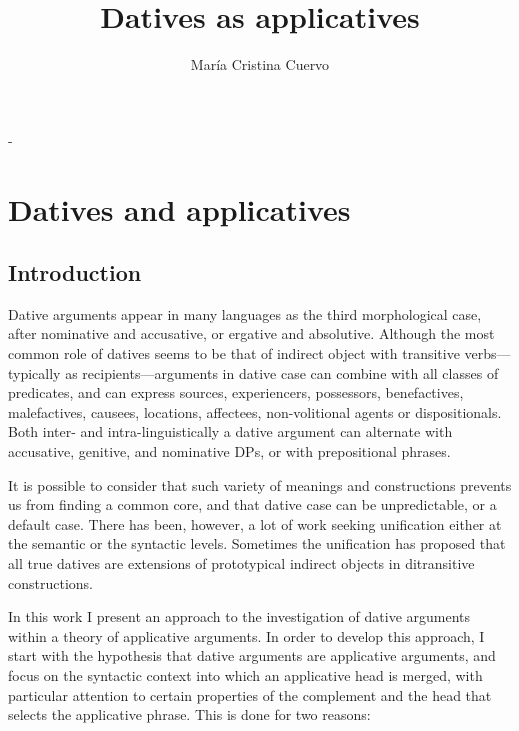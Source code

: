 \documentclass[output=paper,colorlinks,citecolor=brown,nonflat]{./langscibook}
\author{María Cristina Cuervo\affiliation{University of Toronto}}
\title{Datives as applicatives}
\begin{document}
\maketitle 

-%
\section{Datives and applicatives}\label{sec:cuervo:1}

\subsection{Introduction}\label{sec:cuervo:1.1}

Dative arguments appear in many languages as the third morphological case, after nominative and accusative, or ergative and absolutive. Although the most common role of datives seems to be that of indirect object with transitive verbs—typically as recipients—arguments in dative case can combine with all classes of predicates, and can express sources, experiencers, possessors, benefactives, malefactives, causees, locations, affectees, non-volitional agents or dispositionals. Both inter- and intra-linguistically a dative argument can alternate with accusative, genitive, and nominative DPs, or with prepositional phrases. 

It is possible to consider that such variety of meanings and constructions prevents us from finding a common core, and that dative case can be unpredictable, or a default case.  There has been, however, a lot of work seeking unification either at the semantic or the syntactic levels. Sometimes the unification has proposed that all true datives are extensions of prototypical indirect objects in ditransitive constructions. 

In this work I present an approach to the investigation of dative arguments within a theory of applicative arguments. In order to develop this approach, I start with the hypothesis that dative arguments are applicative arguments, and focus on the syntactic context into which an applicative head is merged, with particular attention to certain properties of the complement and the head that selects the applicative phrase. This is done for two reasons:
\end{document}
